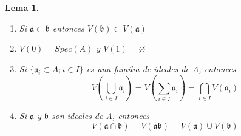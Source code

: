 \documentclass{article}
\newtheorem{lema}{Lema}
\begin{document}
\begin{lema}
    \begin{enumerate}
        \item Si $\mathfrak{a} \subset \mathfrak{b}$ entonces $V(\mathfrak{b}) \subset V(\mathfrak{a})$
        \item $V(0)=Spec(A)$ y $V(1)=\varnothing$
        \item Si $\{\mathfrak{a}_{i} \subset A ; i\in I\}$ es una familia de ideales de A,
        entonces $$V(\bigcup_{i\in I} \mathfrak{a}_i) = V(\sum_{i\in I}\mathfrak{a}_i) = 
        \bigcap_{i\in I} V(\mathfrak{a}_i)$$
        \item Si $\mathfrak{a}$ y $\mathfrak{b}$ son ideales de A, entonces
        $$V(\mathfrak{a}\cap \mathfrak{b}) = V(\mathfrak{a} \mathfrak{b}) = V(\mathfrak{a})\cup V(\mathfrak{b}) $$
    \end{enumerate}
\end{lema}
\end{document}
